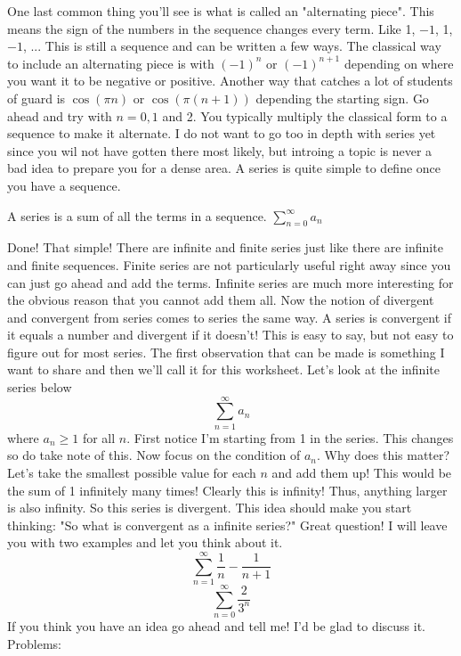 \documentclass[10pt]{article}
\newcommand{\ds}{\displaystyle}
\theoremstyle{Theorem}
\theoremstyle{definition}
\theoremstyle{remark}
\theoremstyle{custom}
\begin{document}
One last common thing you'll see is what is called an "alternating piece".  This means the sign of the numbers in the sequence changes every term. Like 1, $-1$, 1, $-1$, ... This is still a sequence and can be written a few ways. The classical way to include an alternating piece is with $(-1)^n$ or $(-1)^{n+1}$ depending on where you want it to be negative or positive. Another way that catches a lot of students of guard is $\cos(\pi n)$ or $\cos(\pi(n+1))$ depending the starting sign.  Go ahead and try with $n=0, 1$ and 2.  You typically multiply the classical form to a sequence to make it alternate.
\newpage
I do not want to go too in depth with series yet since you wil not have gotten there most likely, but introing a topic is never a bad idea to prepare you for a dense area.  A series is quite simple to define once you have a sequence.
\begin{center}
A series is a sum of all the terms in a sequence. $\ds\sum_{n=0}^{\infty}a_n$
\end{center}
Done! That simple! There are infinite and finite series just like there are infinite and finite sequences. Finite series are not particularly useful right away since you can just go ahead and add the terms. Infinite series are much more interesting for the obvious reason that you cannot add them all.  Now the notion of divergent and convergent from series comes to series the same way. A series is convergent if it equals a number and divergent if it doesn't! This is easy to say, but not easy to figure out for most series. The first observation that can be made is something I want to share and then we'll call it for this worksheet. Let's look at the infinite series below
\[
\sum_{n=1}^{\infty}a_n
\]
where $a_n\geq 1$ for all $n$. First notice I'm starting from 1 in the series. This changes so do take note of this. Now focus on the condition of $a_n$. Why does this matter? Let's take the smallest possible value for each $n$ and add them up! This would be the sum of 1 infinitely many times! Clearly this is infinity! Thus, anything larger is also infinity. So this series is divergent. This idea should make you start thinking: "So what is convergent as a infinite series?" Great question! I will leave you with two examples and let you think about it.
\[
\sum_{n=1}^{\infty}\dfrac{1}{n}-\dfrac{1}{n+1}
\]
\[
\sum_{n=0}^{\infty}\dfrac{2}{3^n}
\]
If you think you have an idea go ahead and tell me! I'd be glad to discuss it.
\newpage
\noindent Problems:
\end{document}
